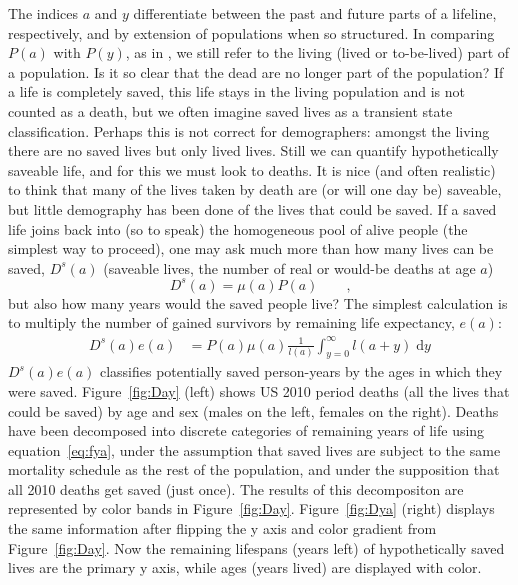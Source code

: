 \documentclass{article}
\newcommand{\dd}{\; \mathrm{d}}
\begin{document}
The indices $a$ and $y$ differentiate between the past and future
parts of a lifeline, respectively, and by extension of populations when
so structured.
In comparing $P(a)$ with $P(y)$, as in \citet{brouard1986structure}, we still
refer to the living (lived or to-be-lived) part of a population.
Is it so clear that the dead are no longer part of the population? If a life is
completely saved, this life stays in the living population and is not counted
as a death, but we often imagine saved lives as a transient state
classification.
Perhaps this is not correct for demographers: amongst the living there
are no saved lives but only lived lives. Still we can quantify
hypothetically saveable life, and for this we must look to deaths.
It is nice (and often realistic) to think that many of the lives taken by death are (or will one day be) saveable, but little demography has been done of the lives that could be saved. If a saved life joins back into (so to speak) the homogeneous pool of alive people (the simplest way
to proceed), one may ask much more than how many lives can be saved, $D^s(a)$
(saveable lives, the number of real or would-be deaths at age $a$)
\begin{equation}
D^s(a) = \mu(a)P(a) \quad \quad \text{,}
\end{equation}
but also how many years would the saved people live? The simplest calculation
is to multiply the number of gained survivors by remaining life expectancy, $e(a)$:
\begin{align}
\label{eq:savedea}
D^s(a)e(a) &= P(a)\mu(a)\frac{1}{l(a)}\int_{y=0}^\infty l(a+y) \dd y %
\end{align}
$D^s(a)e(a)$ classifies potentially saved person-years by the
ages in which they were saved. Figure~\ref{fig:Day} (left) shows US 2010 period
deaths (all the lives that could be saved) by age and sex (males on the left,
females on the right). Deaths have been decomposed into discrete categories of
remaining years of life using equation~\eqref{eq:fya}, under the assumption that saved lives are subject to the same mortality schedule as the rest of the population, and under the supposition that all 2010 deaths get saved (just
once). The results of this decompositon are represented by color bands in
Figure~\ref{fig:Day}. Figure~\ref{fig:Dya} (right) displays the same
information after flipping the y axis and color gradient from
Figure~\ref{fig:Day}. Now the remaining lifespans (years left) of
hypothetically saved lives are the primary y axis, while ages (years lived)
are displayed with color. 
\end{document}
